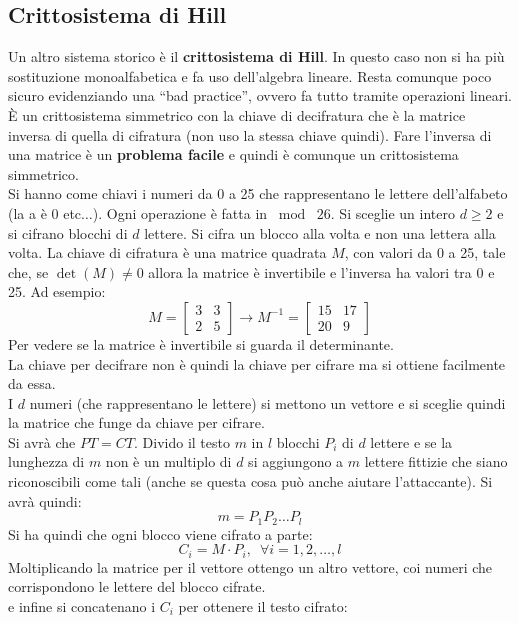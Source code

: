 \documentclass[a4paper,12pt, oneside]{book}
\begin{document}
\subsection{Crittosistema di Hill}
Un altro sistema storico è il \textbf{crittosistema di Hill}. In questo caso non
si ha più sostituzione monoalfabetica e fa uso dell'algebra lineare. Resta
comunque poco sicuro evidenziando una ``bad practice'', ovvero fa tutto tramite
operazioni lineari. È un crittosistema simmetrico con la chiave di decifratura
che è la matrice inversa di quella di cifratura (non uso la stessa chiave
quindi). Fare l'inversa di una matrice è un \textbf{problema facile} e quindi è
comunque un crittosistema simmetrico.\\
Si hanno come chiavi i numeri da 0 a 25 che rappresentano le lettere
dell'alfabeto (la a è 0 etc$\ldots$). Ogni operazione è fatta in
$\bmod\,\,26$. Si sceglie un intero 
$d\geq 2$ e si cifrano blocchi di $d$ lettere. Si cifra un blocco alla volta e
non una lettera alla volta. La chiave di cifratura è una
matrice quadrata $M$, con valori da 0 a 25, tale che, se $\det(M)\neq 0$ allora
la matrice è invertibile e l'inversa ha valori tra 0 e 25. Ad esempio:
\[M=\left[
    \begin{matrix}
      3 & 3\\
      2 & 5
    \end{matrix}
  \right]\to M^{-1}=\left[
    \begin{matrix}
      15 & 17\\
      20 & 9
    \end{matrix}
  \right]
\]
Per vedere se la matrice è invertibile si guarda il determinante.\\
La chiave per decifrare non è quindi la chiave per cifrare ma si ottiene
facilmente da essa.\\
I $d$ numeri (che rappresentano le lettere) si mettono un vettore e si sceglie
quindi la matrice che funge da chiave per cifrare. \\
Si avrà che $PT=CT$. Divido il testo $m$ in $l$ blocchi $P_i$ di $d$ lettere e
se la lunghezza di $m$ non è un multiplo di $d$ si aggiungono a $m$ lettere
fittizie che siano riconoscibili come tali (anche se questa cosa può anche
aiutare l'attaccante). Si avrà quindi:
\[m=P_1P_2\ldots P_l\]
Si ha quindi che ogni blocco viene cifrato a parte:
\[C_i=M\cdot P_i,\,\,\,\forall i =1,2,\ldots, l\]
Moltiplicando la matrice per il vettore ottengo un altro vettore, coi numeri che
corrispondono le lettere del blocco cifrate.\\
e infine si concatenano i $C_i$ per ottenere il testo cifrato:
\end{document}
